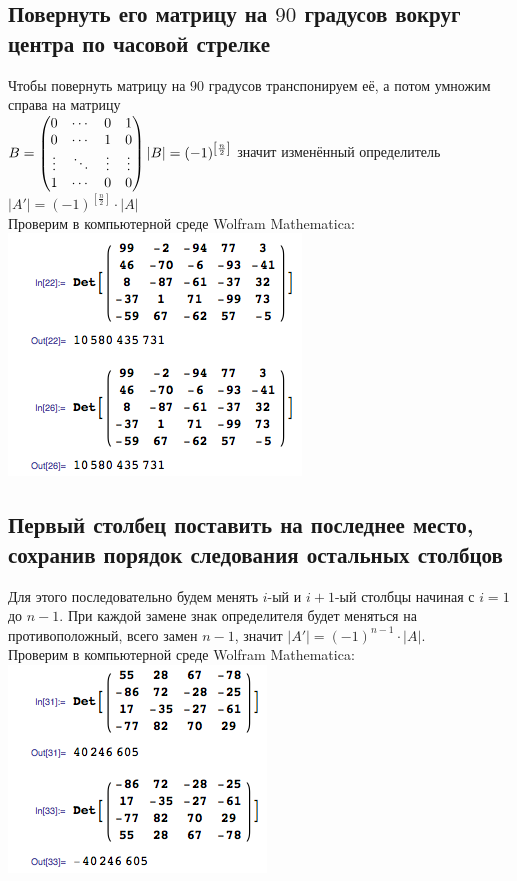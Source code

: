 \subsection{Повернуть его матрицу на $ 90 $ градусов вокруг центра по часовой стрелке}
Чтобы повернуть матрицу на $ 90 $ градусов транспонируем её, а потом умножим справа на матрицу
\\[1em]
$
	B =
	\begin{pmatrix}
		0 & \cdots & 0 & 1 \\
		0 & \cdots & 1 & 0 \\
		\vdots & \ddots & \vdots & \vdots \\
		1 & \cdots & 0 & 0 \\
	\end{pmatrix}
\\
	|B| = (-1)^{\left[\frac{n}{2}\right]}
$ значит изменённый определитель $ |A'| = (-1)^{\left[\frac{n}{2}\right]} \cdot |A| $
\\[1em]
Проверим в компьютерной среде Wolfram Mathematica:
\\
\includegraphics[scale=0.6]{task/1_38/screen4.png}
\subsection{Первый столбец поставить на последнее место, сохранив порядок следования остальных столбцов}
Для этого последовательно будем менять $ i $-ый и $ i+1 $-ый столбцы начиная с $ i = 1 $ до $ n - 1 $.
При каждой замене знак определителя будет меняться на противоположный, всего замен $ n - 1 $, значит $ |A'| = (-1)^{n-1} \cdot |A| $.
\\[1em]
Проверим в компьютерной среде Wolfram Mathematica:
\\
\includegraphics[scale=0.6]{task/1_38/screen5.png}
